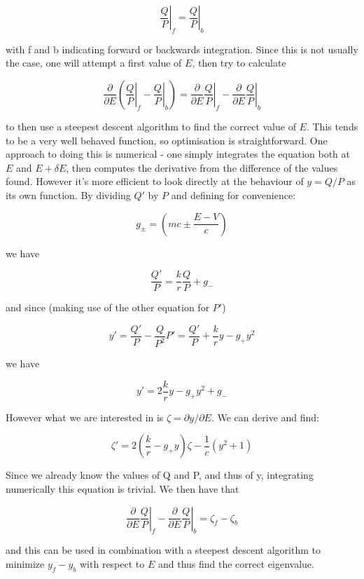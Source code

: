 \documentclass[]{report}
\begin{document}
\begin{equation}
\left. \frac{Q}{P}\right|_f = \left. \frac{Q}{P}\right|_b
\end{equation}

with f and b indicating forward or backwards integration. Since this is not usually the case, one will attempt a first value of $E$, then try to calculate 

\begin{equation}
\frac{\partial}{\partial E}\left(\left. \frac{Q}{P}\right|_f - \left. \frac{Q}{P}\right|_b\right) = 
\frac{\partial}{\partial E}\left. \frac{Q}{P}\right|_f - \frac{\partial}{\partial E}\left. \frac{Q}{P}\right|_b
\end{equation}

to then use a steepest descent algorithm to find the correct value of $E$. This tends to be a very well behaved function, so optimisation is straightforward. One approach to doing this is numerical - one simply integrates the equation both at $E$ and $E+\delta E$, then computes the derivative from the difference of the values found. However it's more efficient to look directly at the behaviour of $y = Q/P$ as its own function. By dividing $Q'$ by $P$ and defining for convenience:

\begin{equation}
g_\pm = \left(mc\pm\frac{E-V}{c}\right)
\end{equation}

we have

\begin{equation}
\frac{Q'}{P} = \frac{k}{r}\frac{Q}{P}+g_-
\end{equation}

and since (making use of the other equation for $P'$)

\begin{equation}
y' = \frac{Q'}{P} - \frac{Q}{P^2}P' = \frac{Q'}{P} + \frac{k}{r} y -g_+y^2
\end{equation}

we have

\begin{equation}
y' = 2\frac{k}{r}y-g_+y^2+g_-
\end{equation}

However what we are interested in is $\zeta = \partial y / \partial E$. We can derive and find:

\begin{equation}
\zeta' = 2\left(\frac{k}{r}-g_+y\right)\zeta-\frac{1}{c}(y^2+1)
\end{equation}

Since we already know the values of Q and P, and thus of y, integrating numerically this equation is trivial. We then have that

\begin{equation}
\frac{\partial}{\partial E}\left. \frac{Q}{P}\right|_f - \frac{\partial}{\partial E}\left. \frac{Q}{P}\right|_b = \zeta_f-\zeta_b
\end{equation}

and this can be used in combination with a steepest descent algorithm to minimize $y_f-y_b$ with respect to $E$ and thus find the correct eigenvalue.




\end{document}
